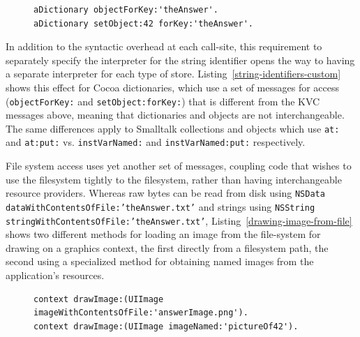 \documentclass[preprint]{sigplanconf}
\begin{document}
\begin{figure}[htbp]
\begin{lstlisting}[style=numbers,label=string-identifiers-custom,caption=Retrieve and store value with custom stores.]
aDictionary objectForKey:'theAnswer'.
aDictionary setObject:42 forKey:'theAnswer'.
\end{lstlisting}
\end{figure}



In addition to the syntactic overhead at each call-site, this requirement to separately specify the interpreter
for the string identifier opens the way to having a separate interpreter for each type of store. 
Listing~\ref{string-identifiers-custom} shows this effect for Cocoa dictionaries, which use a set of messages for
access ({\tt objectForKey:} and {\tt setObject:forKey:}) that is different from the KVC messages above, meaning
 that dictionaries and objects are not interchangeable.  
The same differences apply to Smalltalk collections and objects which use {\tt at:} and {\tt at:put:} vs. {\tt instVarNamed:} and {\tt instVarNamed:put:}
respectively.

\sloppy		%

File system access uses yet another set of messages, coupling code that wishes to use the filesystem tightly to the filesystem,
rather than having interchangeable resource providers.  Whereas raw bytes can be read from disk using
{\tt NSData dataWithContentsOfFile:'theAnswer.txt'} and strings using 
{\tt NSString stringWithContentsOfFile:'theAnswer.txt'},  Listing~\ref{drawing-image-from-file} shows two different methods
for loading an image from the file-system for drawing on a graphics context, the first directly from a filesystem path,
the second using a specialized method for obtaining named images from the application's resources.

\fussy


\begin{figure}[htbp]
\begin{lstlisting}[style=numbers,label=drawing-image-from-file,caption=Drawing an image stored in a file.]
context drawImage:(UIImage imageWithContentsOfFile:'answerImage.png').
context drawImage:(UIImage imageNamed:'pictureOf42').
\end{lstlisting}
\end{figure}
\end{document}
